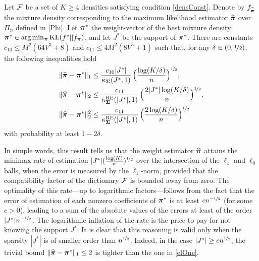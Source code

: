 \begin{proposition}\label{prop:1}
	Let $\cal F$ be a set of $K\ge 4$ densities satisfying condition \eqref{densConst}.
	Denote by $f_{\widehat{\boldsymbol \pi}}$ the mixture density corresponding to the maximum likelihood
	estimator $\widehat{\boldsymbol \pi}$ over $\Pi_n$ defined in \eqref{Phi}. Let $\boldsymbol \pi^*$ the weight-vector
	of the best mixture density: $\boldsymbol \pi^*\in\text{\rm arg}\min_{\boldsymbol \pi} {\rm KL}(f^*||f_{\boldsymbol \pi})$,
	and let $J^*$ be the support of $\boldsymbol \pi^*$. There are constants $c_{10}\le M^2(64V^3+8)$
	and $c_{11}\le 4M^2(8V^3+1)$ such that, for any
	$\delta \in (0,\nicefrac12)$, the following  inequalities hold
	\begin{align}
	\|\widehat{\boldsymbol \pi} - \boldsymbol \pi^*\|_1
	&\leq  \frac{c_{10}|J^*|}{\bar\kappa_{\boldsymbol\Sigma}(J^*,1)}\,\Big(\frac{\log(K/\delta)}{n}\Big)^{\nicefrac12},
	\label{elOne}\\
	\|\widehat{\boldsymbol \pi} - \boldsymbol \pi^*\|_2
	&\leq  \frac{c_{11}}{\kappa^{\rm RE}_{\boldsymbol\Sigma}(|J^*|,1)}\,\Big(\frac{2|J^*|\log(K/\delta)}{n}\Big)^{\nicefrac12},
	\label{euclOne}\\		
	\|\widehat{\boldsymbol \pi} - \boldsymbol \pi^*\|_2^2
	&\leq  \frac{c_{11}}{\kappa^{\rm RE}_{\boldsymbol\Sigma}(|J^*|,1)}\,\Big(\frac{2\log(K/\delta)}{n}\Big)^{\nicefrac12}
	\label{euclTwo}
	\end{align}
	with probability at least $1-2\delta$.
\end{proposition}


In simple words, this result tells us that the weight estimator $\widehat{\boldsymbol \pi}$  attains the
minimax rate of estimation $|J^* |(\frac{\log(K)}{n})^{\nicefrac12}$ over the intersection of the
$\ell_1$ and $\ell_0$ balls, when the error is measured by the $\ell_1$-norm, provided
that the compatibility factor of the dictionary $\mathcal F$ is bounded away from zero.
The optimality of this rate---up to logarithmic factors---follows from the fact that the
error of estimation of each nonzero coefficients of $\boldsymbol \pi^*$ is at least $cn^{-\nicefrac12}$ (for
some $c>0$), leading to a sum of the absolute values of the errors at least of the order
$|J^*|n^{-\nicefrac12}$. The logarithmic inflation of the rate is the price to pay for not knowing
the support $J^*$. It is clear that this reasoning is valid only when the sparsity
$|J^*|$ is of smaller order than $n^{\nicefrac12}$. Indeed, in the case $|J^*|\ge c n^{\nicefrac12}$,
the trivial bound $\|\widehat{\boldsymbol \pi}-\boldsymbol \pi^*\|_1\le 2$ is tighter than the one in \eqref{elOne}.

